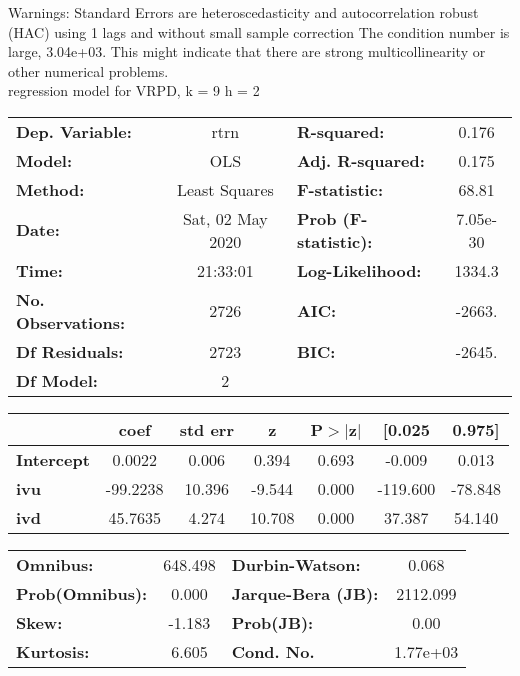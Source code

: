 Warnings: \newline
 [1] Standard Errors are heteroscedasticity and autocorrelation robust (HAC) using 1 lags and without small sample correction \newline
 [2] The condition number is large, 3.04e+03. This might indicate that there are \newline
 strong multicollinearity or other numerical problems.\\ 

regression model for VRPD, k = 9 h = 2\begin{center}
\begin{tabular}{lclc}
\toprule
\textbf{Dep. Variable:}    &       rtrn       & \textbf{  R-squared:         } &     0.176   \\
\textbf{Model:}            &       OLS        & \textbf{  Adj. R-squared:    } &     0.175   \\
\textbf{Method:}           &  Least Squares   & \textbf{  F-statistic:       } &     68.81   \\
\textbf{Date:}             & Sat, 02 May 2020 & \textbf{  Prob (F-statistic):} &  7.05e-30   \\
\textbf{Time:}             &     21:33:01     & \textbf{  Log-Likelihood:    } &    1334.3   \\
\textbf{No. Observations:} &        2726      & \textbf{  AIC:               } &    -2663.   \\
\textbf{Df Residuals:}     &        2723      & \textbf{  BIC:               } &    -2645.   \\
\textbf{Df Model:}         &           2      & \textbf{                     } &             \\
\bottomrule
\end{tabular}
\begin{tabular}{lcccccc}
                   & \textbf{coef} & \textbf{std err} & \textbf{z} & \textbf{P$> |$z$|$} & \textbf{[0.025} & \textbf{0.975]}  \\
\midrule
\textbf{Intercept} &       0.0022  &        0.006     &     0.394  &         0.693        &       -0.009    &        0.013     \\
\textbf{ivu}       &     -99.2238  &       10.396     &    -9.544  &         0.000        &     -119.600    &      -78.848     \\
\textbf{ivd}       &      45.7635  &        4.274     &    10.708  &         0.000        &       37.387    &       54.140     \\
\bottomrule
\end{tabular}
\begin{tabular}{lclc}
\textbf{Omnibus:}       & 648.498 & \textbf{  Durbin-Watson:     } &    0.068  \\
\textbf{Prob(Omnibus):} &   0.000 & \textbf{  Jarque-Bera (JB):  } & 2112.099  \\
\textbf{Skew:}          &  -1.183 & \textbf{  Prob(JB):          } &     0.00  \\
\textbf{Kurtosis:}      &   6.605 & \textbf{  Cond. No.          } & 1.77e+03  \\
\bottomrule
\end{tabular}
\end{center}

